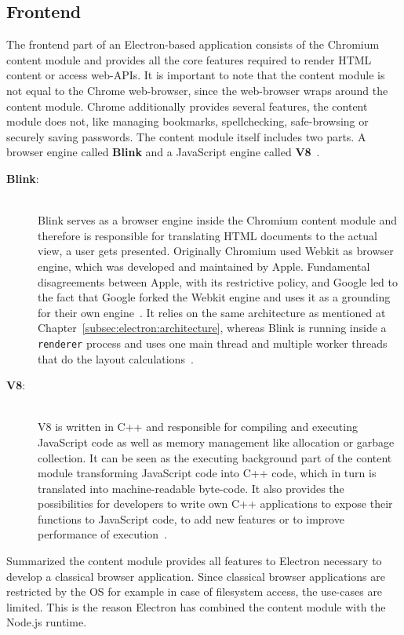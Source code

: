 \subsection{Frontend}
\label{subsec:electron:frontend}
The frontend part of an Electron-based application consists of the Chromium content module and provides all the core features required to render \ac{HTML} content
or access web-\ac{API}s.
It is important to note that the content module is not equal to the Chrome web-browser, since the web-browser wraps around the content module.
Chrome additionally provides several features, the content module does not, like managing bookmarks, spellchecking, safe-browsing or securely saving passwords.
The content module itself includes two parts.
A browser engine called \textbf{Blink} and a JavaScript engine called \textbf{V8}~\cite{electron-in-action}.
\begin{description}
    \item[\textbf{Blink}:] \hfill \\ Blink serves as a browser engine inside the Chromium content module and therefore is responsible for translating \ac{HTML} documents to the actual view, a user gets presented.
    Originally Chromium used Webkit as browser engine, which was developed and maintained by Apple.
    Fundamental disagreements between Apple, with its restrictive policy, and Google led to the fact that Google forked the Webkit engine and uses it as a grounding for their own engine~\cite{heiseBlink}.
    It relies on the same architecture as mentioned at Chapter~\ref{subsec:electron:architecture}, whereas Blink is running inside a \texttt{renderer} process and uses one main thread
    and multiple worker threads that do the layout calculations~\cite{blinkGoogle}.
    \item [\textbf{V8}:] \hfill \\ V8 is written in C++ and responsible for compiling and executing JavaScript code as well as memory management like allocation or garbage collection.
    It can be seen as the executing background part of the content module transforming JavaScript code into C++ code, which in turn is translated into machine-readable byte-code.
    It also provides the possibilities for developers to write own C++ applications to expose their functions to JavaScript code, to add new features or to improve performance of execution~\cite{V8Doc}.

\end{description}
Summarized the content module provides all features to Electron necessary to develop a classical browser application.
Since classical browser applications are restricted by the \ac{OS} for example in case of filesystem access, the use-cases are limited.
This is the reason Electron has combined the content module with the Node.js runtime.

